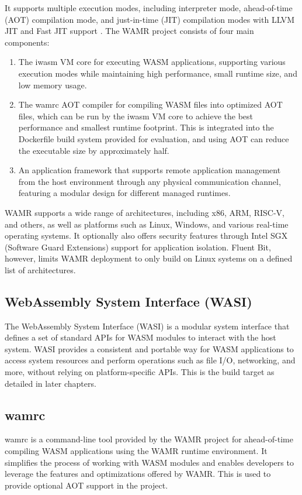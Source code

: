It supports multiple execution modes, including interpreter mode, ahead-of-time (AOT) compilation mode, and just-in-time (JIT) compilation modes with LLVM JIT and Fast JIT support \cite{wamr-docs}. The WAMR project consists of four main components:

\begin{enumerate}
    \item The iwasm VM core for executing WASM applications, supporting various execution modes while maintaining high performance, small runtime size, and low memory usage.
    \item The wamrc AOT compiler for compiling WASM files into optimized AOT files, which can be run by the iwasm VM core to achieve the best performance and smallest runtime footprint. This is integrated into the Dockerfile build system provided for evaluation, and using AOT can reduce the executable size by approximately half.
    \item An application framework that supports remote application management from the host environment through any physical communication channel, featuring a modular design for different managed runtimes.
\end{enumerate}

WAMR supports a wide range of architectures, including x86, ARM, RISC-V, and others, as well as platforms such as Linux, Windows, and various real-time operating systems. It optionally also offers security features through Intel SGX (Software Guard Extensions) support for application isolation. Fluent Bit, however, limits WAMR deployment to only build on Linux systems on a defined list of architectures. 

\subsection{WebAssembly System Interface (WASI)}
The WebAssembly System Interface (WASI) is a modular system interface that defines a set of standard APIs for WASM modules to interact with the host system. WASI provides a consistent and portable way for WASM applications to access system resources and perform operations such as file I/O, networking, and more, without relying on platform-specific APIs. This is the build target as detailed in later chapters.

\subsection{wamrc}
wamrc is a command-line tool provided by the WAMR project for ahead-of-time compiling WASM applications using the WAMR runtime environment. It simplifies the process of working with WASM modules and enables developers to leverage the features and optimizations offered by WAMR. This is used to provide optional AOT support in the project.

